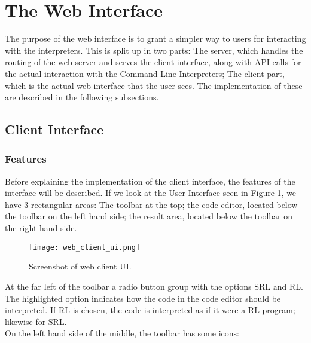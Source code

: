 
\section{The Web Interface}

The purpose of the web interface is to grant a simpler way to users for interacting with the interpreters.
This is split up in two parts:
The server, which handles the routing of the web server and serves the client interface, along with API-calls for the actual interaction with the Command-Line Interpreters;
The client part, which is the actual web interface that the user sees.
The implementation of these are described in the following subsections.

\subsection{Client Interface}


\subsubsection{Features}

\noindent
Before explaining the implementation of the client interface, the features of the interface will be described.
If we look at the User Interface seen in Figure \ref{fig:web_client_ui}, we have 3 rectangular areas: The toolbar at the top; the code editor, located below the toolbar on the left hand side; the result area, located below the toolbar on the right hand side.

\begin{figure}[H]
  \texttt{[image: web\_client\_ui.png]}
  \caption{Screenshot of web client UI.}
  \label{fig:web_client_ui}
\end{figure}

\noindent
At the far left of the toolbar a radio button group with the options SRL and RL. The highlighted option indicates how the code in the code editor should be interpreted. If RL is chosen, the code is interpreted as if it were a RL program; likewise for SRL.\\
On the left hand side of the middle, the toolbar has some icons:\\

